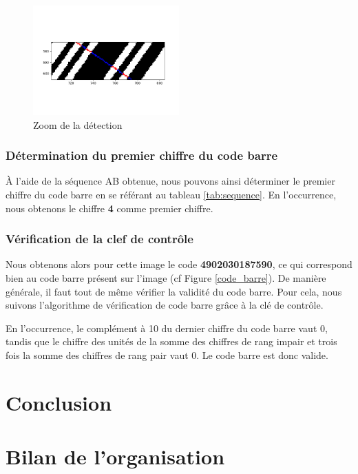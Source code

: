 \documentclass{rapport}
\begin{document}
\begin{figure}[H] 
	\centering
	\includegraphics[width=0.5\textwidth]{images/zoom_code_seuille_couleur.png}
	\caption{Zoom de la détection}
	\label{fig:detection_zoom}
\end{figure}

\subsubsection*{Détermination du premier chiffre du code barre}
À l'aide de la séquence AB obtenue, nous pouvons ainsi déterminer le premier chiffre du code barre en se référant au tableau \ref{tab:sequence}.
En l'occurrence, nous obtenons le chiffre \textbf{4} comme premier chiffre. 

\subsubsection*{Vérification de la clef de contrôle}
Nous obtenons alors pour cette image le code \textbf{4902030187590}, ce qui correspond bien au code barre présent sur l'image (cf Figure \ref{code_barre}).
De manière générale, il faut tout de même vérifier la validité du code barre. Pour cela, nous suivons l'algorithme de vérification de code barre grâce à la clé de contrôle.

En l'occurrence, le complément à 10 du dernier chiffre du code barre vaut 0, tandis que le chiffre des unités de la somme des chiffres de rang impair et trois fois la somme des chiffres de rang pair vaut 0. 
Le code barre est donc valide.


\newpage 

\section{Conclusion}

\section{Bilan de l'organisation}
\end{document}

